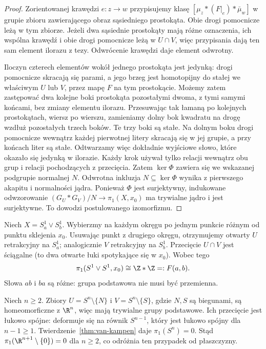 \begin{proof}
Zorientowanej krawędzi $e:z\to w$ przypisujemy klasę
$[\mu_z*(F|_e)*\bar\mu_w]$ w grupie zbioru zawierającego
obraz sąsiedniego prostokąta. Obie drogi pomocnicze leżą w tym
zbiorze. Jeżeli dwa sąsiednie prostokąty mają różne oznaczenia,
ich wspólna krawędź i obie drogi pomocnicze leżą w $U\cap V$,
więc przypisania dają ten sam element ilorazu z tezy.
Odwrócenie krawędzi daje element odwrotny.

Iloczyn czterech elementów wokół jednego prostokąta jest jedynką:
drogi pomocnicze skracają się parami, a jego brzeg jest homotopijny
do stałej we właściwym $U$ lub $V$, przez mapę $F$ na tym prostokącie.
Możemy zatem zastępować dwa kolejne boki prostokąta pozostałymi
dwoma, z tymi samymi końcami, bez zmiany elementu ilorazu.
Przesuwając tak łamaną po kolejnych prostokątach, wiersz po wierszu,
zamieniamy dolny bok kwadratu na drogę wzdłuż pozostałych trzech boków.
Te trzy boki są stałe. Na dolnym boku drogi pomocnicze wewnątrz
każdej pierwotnej litery skracają się w jej grupie, a przy końcach
liter są stałe. Odtwarzamy więc dokładnie wyjściowe słowo,
które okazało się jedynką w ilorazie. Każdy krok używał tylko
relacji wewnątrz obu grup i relacji pochodzących z przecięcia.
Zatem $\ker\Phi$ zawiera się we wskazanej podgrupie normalnej
$N$. Odwrotna inkluzja $N\subseteq\ker\Phi$ wynika
z pierwszego akapitu i normalności jądra. Ponieważ $\Phi$
jest surjektywny, indukowane odwzorowanie
$(G_U*G_V)/N\to\pi_1(X,x_0)$ ma trywialne jądro
i jest surjektywne. To dowodzi postulowanego izomorfizmu.
\end{proof}

\begin{przyklad}
\label{prz:pi1-dwa-okregi}
Niech $X=S^1_a\vee S^1_b$.
Wybierzmy na każdym okręgu po jednym
punkcie różnym od punktu sklejenia
$x_0$. Usuwając punkt z drugiego
okręgu, otrzymujemy otwarty $U$
retrakcyjny na $S^1_a$; analogicznie
$V$ retrakcyjny na $S^1_b$.
Przecięcie $U\cap V$ jest ściągalne
(to dwa otwarte łuki spotykające się
w $x_0$). Wobec tego
\[
 \pi_1(S^1\vee S^1,x_0)
 \cong\Z*\Z=:F(a,b).
\]
Słowa $ab$ i $ba$ są różne:
grupa podstawowa nie musi być przemienna.
\end{przyklad}

\begin{przyklad}
\label{prz:pi1-sfera}
Niech $n\geq2$. Zbiory
$U=S^n\setminus\{N\}$ i
$V=S^n\setminus\{S\}$, gdzie $N,S$
są biegunami, są homeomorficzne
z $\R^n$, więc mają trywialne
grupy podstawowe. Ich przecięcie
jest łukowo spójne: deformuje się
na równik $S^{n-1}$, który jest
łukowo spójny dla $n-1\geq1$.
Twierdzenie~\ref{thm:van-kampen}
daje $\pi_1(S^n)=0$.
Stąd $\pi_1(\R^{n+1}\setminus\{0\})=0$
dla $n\geq2$, co odróżnia ten
przypadek od płaszczyzny.
\end{przyklad}

